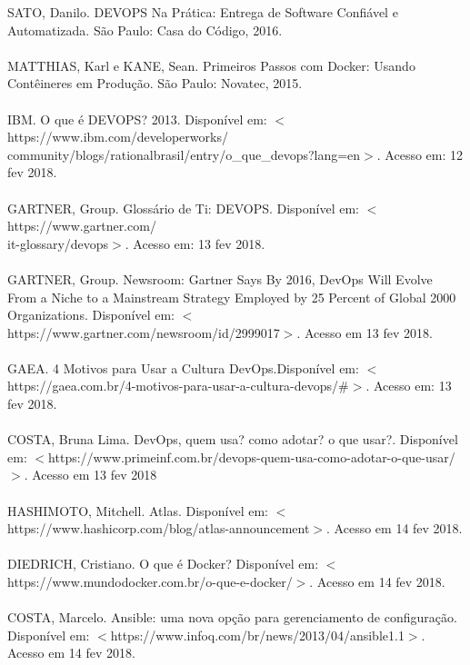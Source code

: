 \documentclass[
	12pt,				%
	openright,			%
	oneside,			%
	a4paper,			%
	english,			%
	brazil				%
	]{abntex2}
\theoremstyle{theorem}
\theoremstyle{definition}
\begin{document}
SATO, Danilo. DEVOPS Na Prática: Entrega de Software Confiável e Automatizada. São Paulo: Casa do Código, 2016.
\\ \\ 
MATTHIAS, Karl e KANE, Sean. Primeiros Passos com Docker: Usando Contêineres em Produção. São Paulo: Novatec, 2015.
\\ \\
IBM. O que é DEVOPS? 2013. Disponível em: $<$https://www.ibm.com/developerworks/\\ community/blogs/rationalbrasil/entry/o\_que\_devops?lang=en$>$. Acesso em: 12 fev 2018.
\\ \\
GARTNER, Group. Glossário de Ti: DEVOPS. Disponível em:
$<$https://www.gartner.com/ \\it-glossary/devops$>$. Acesso em: 13 fev 2018.
\\ \\
GARTNER, Group. Newsroom: Gartner Says By 2016, DevOps Will Evolve From a Niche to a Mainstream Strategy Employed by 25 Percent of Global 2000 Organizations. Disponível em: $<$https://www.gartner.com/newsroom/id/2999017$>$. Acesso em 13 fev 2018.
\\ \\
GAEA. 4 Motivos para Usar a Cultura DevOps.Disponível em: $<$https://gaea.com.br/4-motivos-para-usar-a-cultura-devops/\#$>$. Acesso em: 13 fev 2018.
\\ \\ 
COSTA, Bruna Lima. DevOps, quem usa? como adotar? o que usar?. Disponível em: $<$https://www.primeinf.com.br/devops-quem-usa-como-adotar-o-que-usar/$>$. Acesso em 13 fev 2018
\\ \\ 
HASHIMOTO, Mitchell. Atlas. Disponível em: $<$https://www.hashicorp.com/blog/atlas-announcement$>$. Acesso em 14 fev 2018.
\\ \\
DIEDRICH, Cristiano. O que é Docker? Disponível em: $<$https://www.mundodocker.com.br/o-que-e-docker/$>$. Acesso em 14 fev 2018.
\\ \\
COSTA, Marcelo. Ansible: uma nova opção para gerenciamento de configuração. Disponível em: $<$https://www.infoq.com/br/news/2013/04/ansible1.1$>$. Acesso em 14 fev 2018.
\\ \\

%
%

\printindex
\end{document}

